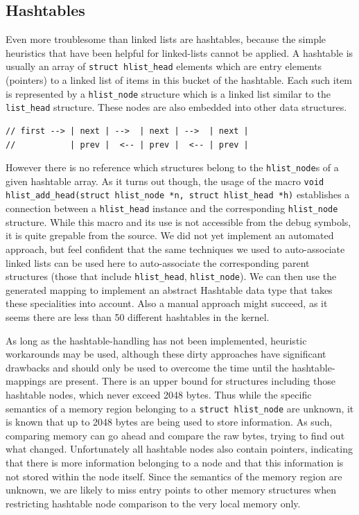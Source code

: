 \subsection{Hashtables}
Even more troublesome than linked lists are hashtables, because the simple heuristics that have been helpful for linked-lists cannot be applied.
A hashtable is usually an array of \texttt{struct hlist\_head} elements which are entry elements (pointers) to a linked list of items in this bucket of the hashtable.
Each such item is represented by a \texttt{hlist\_node} structure which is a linked list similar to the \texttt{list\_head} structure. These nodes are also embedded into other data structures.
\begin{lstlisting}[frame=single,caption=Headed linked lists as used in the linux kernel,label=lst:hlists]
// first --> | next | -->  | next | -->  | next | 
//           | prev |  <-- | prev |  <-- | prev |
\end{lstlisting}
However there is no reference which structures belong to the \texttt{hlist\_node}s of a given hashtable array.
As it turns out though, the usage of the macro \texttt{void hlist\_add\_head(struct hlist\_node *n, struct hlist\_head *h)} establishes a connection between a \texttt{hlist\_head} instance and the corresponding \texttt{hlist\_node} structure.
While this macro and its use is not accessible from the debug symbols, it is quite grepable from the source.
We did not yet implement an automated approach, but feel confident that the same techniques we used to auto-associate linked lists can be used here to auto-associate the corresponding parent structures
(those that include \texttt{hlist\_head}, \texttt{hlist\_node}).
We can then use the generated mapping to implement an abstract Hashtable data type that takes these specialities into account.
Also a manual approach might succeed, as it seems there are less than 50 different hashtables in the kernel.

As long as the hashtable-handling has not been implemented, heuristic workarounds may be used, %
although these dirty approaches have significant drawbacks and should only be used to overcome the time until the hashtable-mappings are present.
There is an upper bound for structures including those hashtable nodes, which never exceed 2048 bytes.
Thus while the specific semantics of a memory region belonging to a \texttt{struct hlist\_node} are unknown,
it is known that up to 2048 bytes are being used to store information. As such, comparing memory can go ahead and compare the raw bytes,
trying to find out what changed.
Unfortunately all hashtable nodes also contain pointers, indicating that there is more information belonging to a node and that this information is not stored within the node itself.
Since the semantics of the memory region are unknown, we are likely to miss entry points to other memory structures when restricting hashtable node comparison to the very local memory only.

